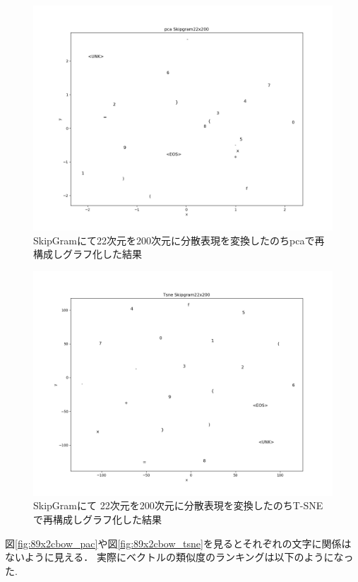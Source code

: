 \documentclass[a4j,11pt,report]{jsbook}
\begin{document}
\begin{center}
  \begin{figure}[H]
    \centering
    \includegraphics[width=0.8\linewidth]{image/pca_skipgram.png}
    \caption{SkipGramにて22次元を200次元に分散表現を変換したのちpcaで再構成しグラフ化した結果}
    \label{fig:22x2_skippca}
  \end{figure}
\end{center}


\begin{center}
  \begin{figure}[H]
    \centering
    \includegraphics[width=0.8\linewidth]{image/tsne_skipgram.png}
    \caption{SkipGramにて 22次元を200次元に分散表現を変換したのちT-SNEで再構成しグラフ化した結果}
    \label{fig:22x2skip_tsne}
  \end{figure}
\end{center}

図\ref{fig:89x2cbow_pac}や図\ref{fig:89x2cbow_tsne}を見るとそれぞれの文字に関係はないように見える．
実際にベクトルの類似度のランキングは以下のようになった.
\end{document}
